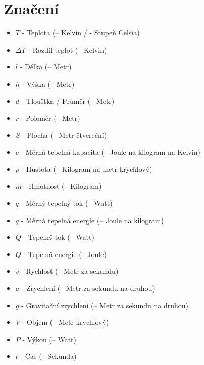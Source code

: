 \documentclass{article}
\begin{document}
\maketitle
\tableofcontents
\newpage




\section{Značení}

\begin{itemize}
    \item $T$ - Teplota (\ueqK \myFS -- Kelvin / \ueqCELS \myFS - Stupeň Celsia)
    \item $\Delta T$ - Rozdíl teplot (\ueqK \myFS -- Kelvin)
    \item $l$ - Délka (\ueqM \myFS -- Metr)
    \item $h$ - Výška (\ueqM \myFS -- Metr)
    \item $d$ - Tloušťka / Průměr (\ueqM \myFS -- Metr)
    \item $r$ - Poloměr (\ueqM \myFS -- Metr)
    \item $S$ - Plocha (\ueqMsq \myFS -- Metr čtvereční)
    \item $c$ - Měrná tepelná kapacita (\ueqJandKGinvKinv \myFS -- Joule na kilogram na Kelvin)
    \item $\rho$ - Hustota (\ueqKGandMinvcu \myFS -- Kilogram na metr krychlový)
    \item $m$ - Hmotnost (\ueqKG \myFS -- Kilogram)
    \item $\dot{q}$ - Měrný tepelný tok (\ueqWandMinvsq \myFS -- Watt)
    \item $q$ - Měrná tepelná energie (\ueqJandMinvsq \myFS -- Joule na kilogram)
    \item $\dot{Q}$ - Tepelný tok (\ueqW \myFS -- Watt)
    \item $Q$ - Tepelná energie (\ueqJ \myFS -- Joule)
    \item $v$ - Rychlost (\ueqMandSinv \myFS -- Metr za sekundu)
    \item $a$ - Zrychlení (\ueqMandSinvsq \myFS -- Metr za sekundu na druhou)
    \item $g$ - Gravitační zrychlení (\ueqMandSinvsq \myFS -- Metr za sekundu na druhou)
    \item $V$ - Objem (\ueqMcu \myFS -- Metr krychlový)
    \item $P$ - Výkon (\ueqW \myFS -- Watt)
    \item $t$ - Čas (\ueqS \myFS -- Sekunda)

\end{itemize}
\end{document}
